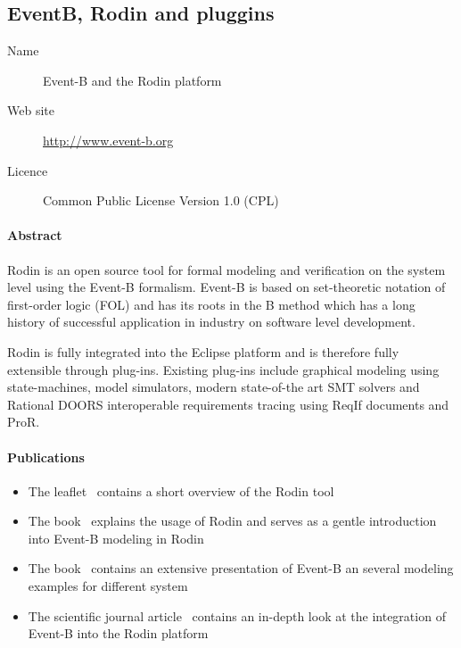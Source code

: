 \subsection{EventB, Rodin and pluggins}

\begin{description}
\item[Name] Event-B and the Rodin platform
\item[Web site] \url{http://www.event-b.org}
\item[Licence] Common Public License Version 1.0 (CPL)
\end{description}

\paragraph{Abstract}

Rodin is an open source tool for formal modeling and verification on the system
level using the Event-B formalism. Event-B is based on set-theoretic notation of
first-order logic (FOL) and has its roots in the B method which has a long
history of successful application in industry on software level development.

Rodin is fully integrated into the Eclipse platform and is therefore fully
extensible through plug-ins. Existing plug-ins include graphical modeling using
state-machines, model simulators, modern state-of-the art SMT solvers and
Rational DOORS interoperable requirements tracing using ReqIf documents and
ProR.

\paragraph{Publications}

\begin{itemize}
\item The leaflet~\cite{RodinLeaflet} contains a short overview of the Rodin
  tool
\item The book~\cite{RodinHandbook} explains the usage of Rodin and serves as a
  gentle introduction into Event-B modeling in Rodin
\item The book~\cite{Abrial:2010:MES:1855020} contains an extensive presentation
  of Event-B an several modeling examples for different system
\item The scientific journal article~\cite{AbrialBHHMV10} contains an in-depth
  look at the integration of Event-B into the Rodin platform
\end{itemize}



